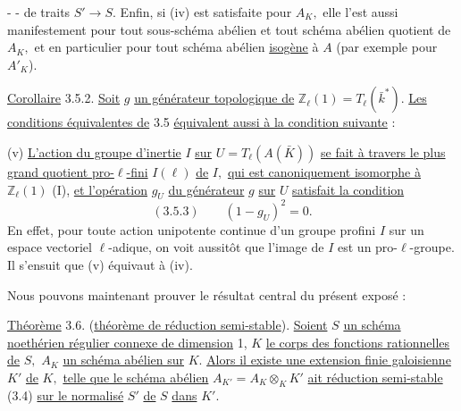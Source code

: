 -  -
de traits \(S'\longrightarrow S.\) Enfin, si (iv) est satisfaite pour \(A_K,\) elle l'est aussi manifestement pour tout sous-schéma abélien et tout schéma abélien quotient de \(A_K,\) et en particulier pour tout schéma abélien \uline{isogène} à \(A\) (par exemple pour \(A'_K\)).

\uline{Corollaire} 3.5.2. \uline{Soit} \(g\) \uline{un générateur topologique de} \(\mathbb Z_\ell(1)=T_\ell(\bar k^*).\) \uline{Les conditions équivalentes de} 3.5 \uline{équivalent aussi à la condition suivante} :

(v) \uline{L'action du groupe d'inertie} \(I\) \uline{sur} \(U=T_\ell(A(\bar K))\) \uline{se fait à travers le plus grand quotient pro-\(\ell\)-fini} \(I(\ell)\) \uline{de} \(I,\) \uline{qui est canoniquement isomorphe à} \(\mathbb Z_\ell(1)\) (I\qquad), \uline{et l'opération} \(g_U\) \uline{du générateur} \(g\) \uline{sur} \(U\) \uline{satisfait la condition}
\[
(3.5.3)\qquad(1-g_U)^2=0.
\]
En effet, pour toute action unipotente continue d'un groupe profini \(I\) sur un espace vectoriel \(\ell\)-adique, on voit aussitôt que l'image de \(I\) est un pro-\(\ell\)-groupe. Il s'ensuit que (v) équivaut à (iv).

Nous pouvons maintenant prouver le résultat central du présent exposé :

\uline{Théorème} 3.6. (\uline{théorème de réduction semi-stable}). \uline{Soient} \(S\) \uline{un schéma noethérien régulier connexe de dimension} 1, \(K\) \uline{le corps des fonctions rationnelles de} \(S,\) \(A_K\) \uline{un schéma abélien sur} \(K.\) \uline{Alors il existe une extension finie galoisienne} \(K'\) \uline{de} \(K,\) \uline{telle que le schéma abélien} \(A_{K'}=A_K\otimes_K K'\) \uline{ait réduction semi-stable} (3.4) \uline{sur le normalisé} \(S'\) \uline{de} \(S\) \uline{dans} \(K'.\)
